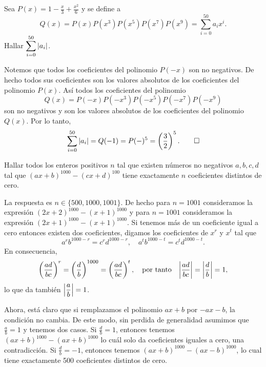 \begin{example}[AIME, 2016]
    Sea $P(x) = 1 - \frac{x}{3} + \frac{x^2}{6}$ y se define a
    \[
        Q(x) = P(x)P(x^3)P(x^5)P(x^7)P(x^9) = \sum_{i = 0}^{50} a_i x^i.
    \]
    Hallar $\ds \sum_{i = 0}^{50} |a_i|$.
\end{example}
\begin{solution}
    Notemos que todos los coeficientes del polinomio $P(-x)$ son no negativos.
    De hecho todos sus coeficientes son los valores absolutos de los coeficientes del polinomio $P(x)$.
    Así todos los coeficientes del polinomio
    \[
        Q(x) = P(-x)P(- x^3)P(- x^5)P(- x^7)P(- x^9)
    \]
    son no negativos y son los valores absolutos de los coeficientes del polinomio $Q(x)$.
    Por lo tanto,
    \[
        \sum_{i = 0}^{50} |a_i| = Q(-1) = P(-)^5 = \left(\frac{3}{2}\right)^5. \qedhere
    \]
\end{solution}

\begin{example}
    Hallar todos los enteros positivos $n$ tal que existen números no negativos $a,b,c,d$ tal que $(ax + b)^{1000} - (cx + d)^{100}$ tiene exactamente $n$ coeficientes distintos de cero.
\end{example}
\begin{solution}
    La respuesta es $n \in \{500, 1000, 1001\}$.
    De hecho para $n = 1001$ consideramos la expresión $(2x + 2)^{1000} - (x + 1)^{1000}$ y para $n = 1001$ consideramos la expresión $(2x + 1)^{1000} - (x + 1)^{1000}$.
    Si tenemos más de un coeficiente igual a cero entonces existen dos coeficientes, digamos los coeficientes de $x^r$ y $x^t$ tal que
    \[
        a^r b^{1000 - r} = c^r d^{1000 - r}, \quad a^t b^{1000 - t} = c^t d^{1000 - t}.
    \]
    En consecuencia,
    \[
        \left(\frac{ad}{bc}\right)^r = \left(\frac{d}{b}\right)^{1000} = \left(\frac{ad}{bc}\right)^t, \quad \text{por tanto} \quad \abs*{\frac{ad}{bc}} = \abs*{\frac{d}{b}} = 1,
    \]
    lo que da también $\abs*{\dfrac{a}{b}} = 1$.

    Ahora, está claro que si remplazamos el polinomio $ax + b$ por $-ax - b$, la condición no cambia.
    De este modo, sin perdida de generalidad asumimos que $\frac{a}{b} = 1$ y tenemos dos casos.
    Si $\frac{d}{b} = 1$, entonces tenemos $(ax + b)^{1000} - (ax + b)^{1000}$ lo cuál solo da coeficientes iguales a cero, una contradicción.
    Si $\frac{d}{b} = -1$, entonces tenemos $(ax + b)^{1000} - (ax - b)^{1000}$, lo cual tiene exactamente 500 coeficientes distintos de cero.
\end{solution}

